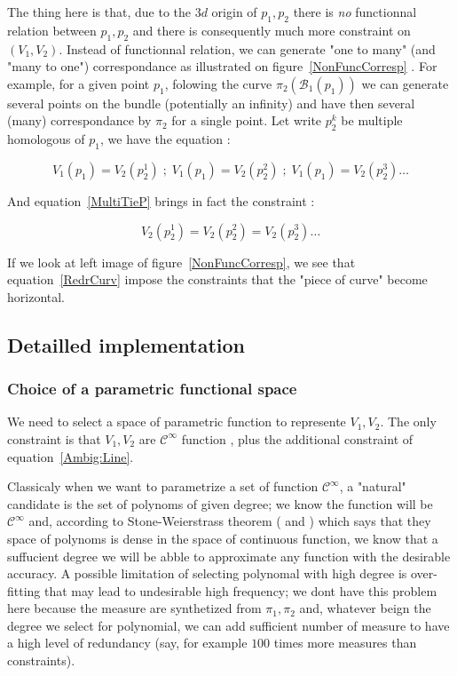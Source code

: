 \documentclass[a4paper]{article}
\newcommand{\Bund}[1]{\ensuremath{\mathcal{B}_{#1}}}
\newcommand{\BundO}{\Bund{1}}
\begin{document}
The thing here is that, due to the $3d$ origin of $p_1,p_2$ there is
\emph{no} functionnal relation between $p_1,p_2$ and there is consequently
much more constraint on $(V_1,V_2)$. Instead of functionnal relation,
we can generate  "one to many" (and  "many to one") correspondance as illustrated on figure~\ref{NonFuncCorresp} .
For example, for a given  point $p_1$, folowing the curve $\pi_2(\BundO(p_1))$ we can generate
several points on the bundle (potentially an infinity) and have then several (many) correspondance
by  $\pi_2$ for a single point. Let write $p^k_2$ be multiple homologous of $p_1$,
we have the equation  :


\begin{equation}
    V_1(p_1) = V_2(p^1_2)   \;;\; V_1(p_1) = V_2(p^2_2)   \;;\; V_1(p_1) = V_2(p^3_2)  \dots \label{MultiTieP}
\end{equation}


And equation~\ref{MultiTieP} brings in fact the constraint : 

\begin{equation}
V_2(p^1_2) = V_2(p^2_2)  =  V_2(p^3_2) \dots \label{RedrCurv}
\end{equation}

If we look at left image of figure~\ref{NonFuncCorresp}, we see that equation~\ref{RedrCurv}
impose the constraints that the "piece of curve" become horizontal.



\subsection{Detailled implementation}


\subsubsection{Choice of a parametric functional space}
\label{ChoicePolyn}

We need to select a space of parametric function to represente $V_1,V_2$. The only constraint
is that $V_1,V_2$ are $\mathcal{C}^{\infty}$ function , plus the additional constraint of 
equation~\ref{Ambig:Line}. 

Classicaly when we want to parametrize a set of function  $\mathcal{C}^{\infty}$,
a "natural" candidate is the set of polynoms of given degree; we know the function will be
$\mathcal{C}^{\infty}$ and, according to Stone-Weierstrass theorem (\cite{Weierstrass1885} and \cite{Stone1937})
which says that they space of polynoms is dense in the space of continuous function, we know that a suffucient
degree we will be abble to approximate any function with the desirable accuracy. A possible
limitation of selecting polynomal with high degree is over-fitting that may lead to
undesirable high frequency; we dont have this problem here because  the measure
are synthetized from $\pi_1,\pi_2$ and, whatever beign the degree we select for polynomial,
we can add sufficient number of measure to have a high level of redundancy (say, for example
$100$ times more measures than constraints).
\end{document}
